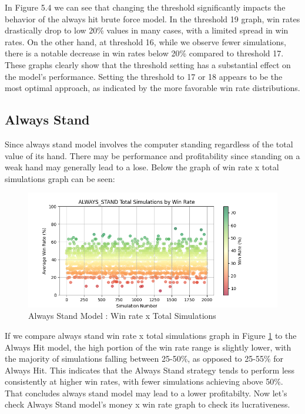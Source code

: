 \documentclass[a4paper,12pt]{report}
\begin{document}
In Figure 5.4 we can see that changing the threshold significantly impacts the behavior of the always hit brute force model. In the threshold 19 graph, win rates drastically drop to low 20\% values in many cases, with a limited spread in win rates. On the other hand, at threshold 16, while we observe fewer simulations, there is a notable decrease in win rates below 20\% compared to threshold 17. These graphs clearly show that the threshold setting has a substantial effect on the model's performance. Setting the threshold to 17 or 18 appears to be the most optimal approach, as indicated by the more favorable win rate distributions.


\subsection{Always Stand}
Since always stand model involves the computer standing  regardless of the total value of its hand. There may be performance and profitability since standing on a weak hand may generally lead to a lose. Below the graph of win rate x total simulations graph can be seen:
\baselineskip

\begin{figure}[h]
\begin{center}
\includegraphics[scale=0.6]{figures/graphs/as_wr_ts.png}
\end{center}
\caption{Always Stand Model : Win rate x Total Simulations}
\label{fig:ah_wr_ts}
\end{figure}
\baselineskip

If we compare always stand win rate x total simulations graph in Figure \ref{fig:ah_wr_ts} to the Always Hit model, the high portion of the win rate range is slightly lower, with the majority of simulations falling between 25-50\%, as opposed to 25-55\% for Always Hit. This indicates that the Always Stand strategy tends to perform less consistently at higher win rates, with fewer simulations achieving above 50\%. That concludes always stand model may lead to a lower profitabilty. Now let's check Always Stand model's money x win rate graph to check its lucrativeness.
\end{document}

